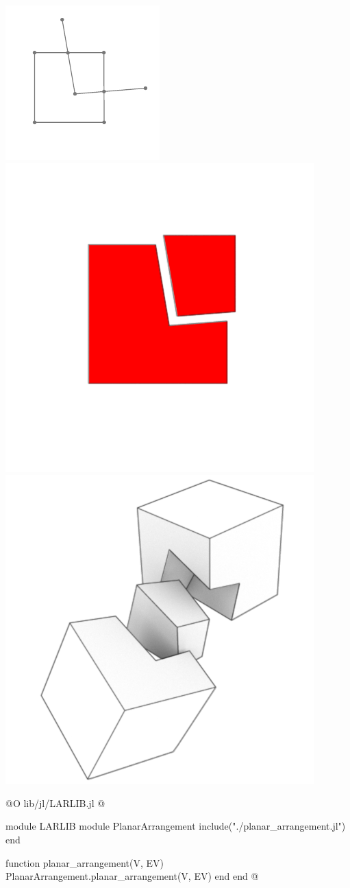 \includegraphics{./img/ch1-6.pdf}\\
\includegraphics{./img/ch1-7.png}
\includegraphics{./img/ch1-8.png}


@O lib/jl/LARLIB.jl
@{module LARLIB
    module PlanarArrangement
        include("./planar_arrangement.jl")
    end

    function planar_arrangement(V, EV)
        PlanarArrangement.planar_arrangement(V, EV)
    end
end
@}